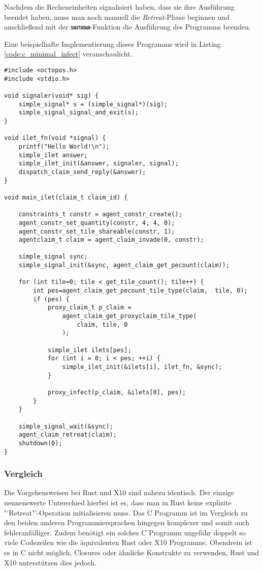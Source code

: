 Nachdem die Recheneinheiten signalisiert haben, dass sie ihre Ausführung beendet haben, muss man noch manuell
die \textit{Retreat}-Phase beginnen und anschließend mit der \texttt{\textsc{\textbf{shutdown}}}-Funktion
die Ausführung des Programms beenden.

Eine beispielhafte Implementierung dieses Programms wird in Listing \ref{code:c_minimal_infect} veranschaulicht.

\lstset{basicstyle=\small}
\begin{lstlisting}[float,caption={Minimales Invade, Infect, Retreat in C},label=code:c_minimal_infect]
#include <octopos.h>
#include <stdio.h>

void signaler(void* sig) {
    simple_signal* s = (simple_signal*)(sig);
    simple_signal_signal_and_exit(s);
}

void ilet_fn(void *signal) {
    printf("Hello World!\n");
    simple_ilet answer;
    simple_ilet_init(&answer, signaler, signal);
    dispatch_claim_send_reply(&answer);
}

void main_ilet(claim_t claim_id) {

    constraints_t constr = agent_constr_create();
    agent_constr_set_quantity(constr, 4, 4, 0);
    agent_constr_set_tile_shareable(constr, 1);
    agentclaim_t claim = agent_claim_invade(0, constr);

    simple_signal sync;
    simple_signal_init(&sync, agent_claim_get_pecount(claim));

    for (int tile=0; tile < get_tile_count(); tile++) {
        int pes=agent_claim_get_pecount_tile_type(claim,  tile, 0);
        if (pes) {
            proxy_claim_t p_claim =
                agent_claim_get_proxyclaim_tile_type(
                    claim, tile, 0
                );

            simple_ilet ilets[pes];
            for (int i = 0; i < pes; ++i) {
                simple_ilet_init(&ilets[i], ilet_fn, &sync);
            }

            proxy_infect(p_claim, &ilets[0], pes);
        }
    }

    simple_signal_wait(&sync);
    agent_claim_retreat(claim);
    shutdown(0);
}
\end{lstlisting}
\lstset{basicstyle=\normalsize}

\subsubsection{Vergleich}

Die Vorgehensweisen bei Rust und X10 sind nahezu identisch. Der einzige nennenswerte Unterschied hierbei ist es, dass
man in Rust keine explizite "'Retreat"'-Operation initialisieren muss.
Das C Programm ist im Vergleich zu den beiden anderen Programmiersprachen hingegen komplexer und somit auch
fehleranfälliger. Zudem benötigt ein solches C Programm ungefähr doppelt so viele 
Codezeilen wie die äquivalenten Rust oder X10 Programme. Obendrein ist es in C nicht möglich, Closures oder
ähnliche Konstrukte zu verwenden, Rust und X10 unterstützen dies jedoch.
